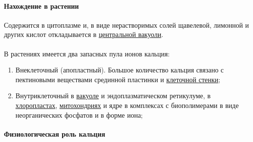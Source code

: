 \paragraph*{Нахождение в растении}

\paragraph*{}Содержится в цитоплазме и, в виде нерастворимых солей щавелевой, лимонной и других кислот откладывается в \hyperlink{cell_vakuol}{центральной вакуоли}.


\paragraph*{}В растениях имеется два запасных пула ионов кальция: 

\begin{enumerate}

\item Внеклеточный (апопластный). Большое количество кальция связано с пектиновыми веществами срединной пластинки и \hyperlink{cell_wall}{клеточной стенки};
\item Внутриклеточный в \hyperlink{cell_vakuol}{вакуоле} и эндоплазматическом ретикулуме, в \hyperlink{cell_plastids}{хлоропластах}, \hyperlink{mitohondria}{митохондриях} и ядре в комплексах с биополимерами в виде неорганических фосфатов и в форме иона;

\end{enumerate}

\paragraph*{Физиологическая роль кальция}

